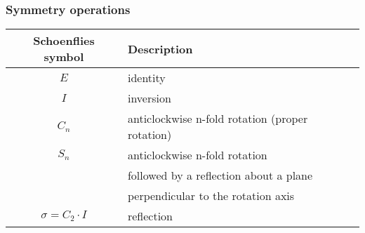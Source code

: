 \documentclass[11pt,a4paper]{report}
\begin{document}
\subsubsection{Symmetry operations}

\begin{center}
\begin{tabular}{|c|l|}
\hline
Schoenflies symbol &  Description\\
\hline
$E$ & identity \\
$I$ & inversion \\
$C_n$ & anticlockwise n-fold rotation (proper rotation)\\
$S_n$ & anticlockwise n-fold rotation\\
    & followed by a reflection about a plane \\
    & perpendicular to the rotation axis\\
$\sigma=C_2\cdot I$ & reflection\\
\hline
\end{tabular}
\end{center}
\end{document}

